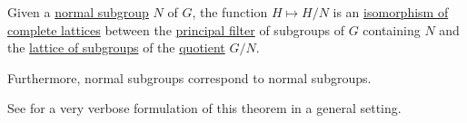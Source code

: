 \begin{theorem}\label{thm:lattice_theorem_for_subgroups}
  Given a \hyperref[def:normal_subgroup]{normal subgroup} \( N \) of \( G \), the function \( H \mapsto H / N \) is an \hyperref[def:semilattice/homomorphism]{isomorphism of complete lattices} between the \hyperref[def:lattice_ideal/principal]{principal filter} of subgroups of \( G \) containing \( N \) and the \hyperref[thm:substructures_form_complete_lattice]{lattice of subgroups} of the \hyperref[def:group/quotient]{quotient} \( G / N \).

  Furthermore, normal subgroups correspond to normal subgroups.
\end{theorem}
\begin{comments}
  \item See  for a very verbose formulation of this theorem in a general setting.
\end{comments}
